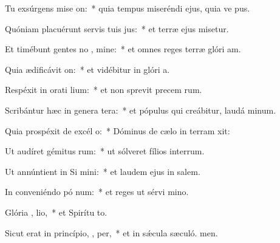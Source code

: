 \item Tu exsúrgens mise on:~* quia tempus miseréndi ejus, quia ve pus.
\item Quóniam placuérunt servis tuis  jus:~* et terræ ejus misetur.
\item Et timébunt gentes no , mine:~* et omnes reges terræ glóri am.
\item Quia ædificávit  on:~* et vidébitur in glóri a.
\item Respéxit in orati lium:~* et non sprevit precem rum.
\item Scribántur hæc in genera tera:~* et pópulus qui creábitur, laudá minum.
\item Quia prospéxit de excél  o:~* Dóminus de cælo in terram xit:
\item Ut audíret gémitus rum:~* ut sólveret fílios interrum.
\item Ut annúntient in Si  mini:~* et laudem ejus in salem.
\item In conveniéndo pó  num:~* et reges ut sérvi mino.
\item Glória ,  lio,~* et Spirítu to.
\item Sicut erat in princípio,  ,  per,~* et in sǽcula sæculó. men.
